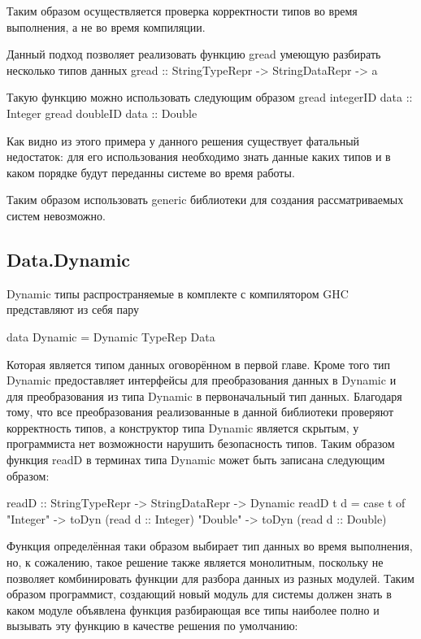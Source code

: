 \documentclass[a4paper,12pt]{article}
\newenvironment{code}{\footnotesize\verbatim}{\endverbatim\normalsize}
\begin{document}
Таким образом осуществляется проверка корректности типов во время
выполнения, а не во время компиляции.

Данный подход позволяет реализовать функцию gread умеющую разбирать
несколько типов данных
\begin{code}
  gread :: StringTypeRepr -> StringDataRepr -> a
\end{code}

Такую функцию можно использовать следующим образом
\begin{code}
  gread integerID data :: Integer
  gread doubleID  data :: Double
\end{code}

Как видно из этого примера у данного решения существует фатальный
недостаток: для его использования необходимо знать данные каких типов
и в каком порядке будут переданны системе во время работы.

Таким образом использовать generic библиотеки для создания
рассматриваемых систем невозможно.

\subsection{Data.Dynamic}

Dynamic типы распространяемые в комплекте с компилятором GHC
представляют из себя пару

\begin{code}
  data Dynamic = Dynamic TypeRep Data
\end{code}

Которая является типом данных оговорённом в первой главе. Кроме того
тип Dynamic предоставляет интерфейсы для преобразования данных в
Dynamic и для преобразования из типа Dynamic в первоначальный тип
данных. Благодаря тому, что все преобразования реализованные в данной
библиотеки проверяют корректность типов, а конструктор типа Dynamic
является скрытым, у программиста нет возможности нарушить безопасность
типов. Таким образом функция readD в терминах типа Dynamic может быть
записана следующим образом:

\begin{code}
  readD :: StringTypeRepr -> StringDataRepr -> Dynamic
  readD t d = case t of
                "Integer" -> toDyn (read d :: Integer)
                "Double"  -> toDyn (read d :: Double)
\end{code}

Функция определённая таки образом выбирает тип данных во время
выполнения, но, к сожалению, такое решение также является монолитным,
поскольку не позволяет комбинировать функции для разбора данных из
разных модулей. Таким образом программист, создающий новый модуль для
системы должен знать в каком модуле объявлена функция разбирающая все
типы наиболее полно и вызывать эту функцию в качестве решения по
умолчанию:
\end{document}

